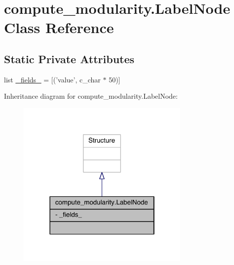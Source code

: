 \hypertarget{classcompute__modularity_1_1_label_node}{\section{compute\+\_\+modularity.\+Label\+Node Class Reference}
\label{classcompute__modularity_1_1_label_node}
}
\subsection*{Static Private Attributes}
\begin{DoxyCompactItemize}
\item 
list \hyperlink{classcompute__modularity_1_1_label_node_a1531c352cf0422c0360c628750324bd5}{\+\_\+fields\+\_\+} = \mbox{[}('value', c\+\_\+char $\ast$ 50)\mbox{]}
\end{DoxyCompactItemize}


Inheritance diagram for compute\+\_\+modularity.\+Label\+Node\+:\nopagebreak
\begin{figure}[H]
\begin{center}
\leavevmode
\includegraphics[width=238pt]{classcompute__modularity_1_1_label_node__inherit__graph}
\end{center}
\end{figure}


